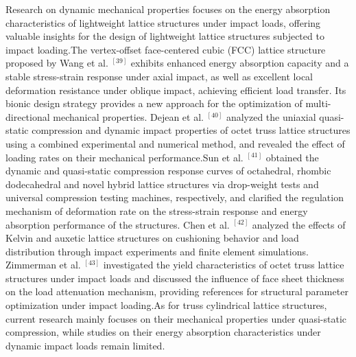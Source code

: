 \documentclass{article} %
\begin{document}
Research on dynamic mechanical properties focuses on the energy absorption characteristics of lightweight lattice structures under impact loads, offering valuable insights for the design of lightweight lattice structures subjected to impact loading.The vertex-offset face-centered cubic (FCC) lattice structure proposed by Wang et al. ${}^{[39]}$ exhibits enhanced energy absorption capacity and a stable stress-strain response under axial impact, as well as excellent local deformation resistance under oblique impact, achieving efficient load transfer. Its bionic design strategy provides a new approach for the optimization of multi-directional mechanical properties. Dejean et al. ${}^{[40]}$ analyzed the uniaxial quasi-static compression and dynamic impact properties of octet truss lattice structures using a combined experimental and numerical method, and revealed the effect of loading rates on their mechanical performance.Sun et al. ${}^{[41]}$ obtained the dynamic and quasi-static compression response curves of octahedral, rhombic dodecahedral and novel hybrid lattice structures via drop-weight tests and universal compression testing machines, respectively, and clarified the regulation mechanism of deformation rate on the stress-strain response and energy absorption performance of the structures. Chen et al. ${}^{[42]}$ analyzed the effects of Kelvin and auxetic lattice structures on cushioning behavior and load distribution through impact experiments and finite element simulations. Zimmerman et al. ${}^{[43]}$ investigated the yield characteristics of octet truss lattice structures under impact loads and discussed the influence of face sheet thickness on the load attenuation mechanism, providing references for structural parameter optimization under impact loading.As for truss cylindrical lattice structures, current research mainly focuses on their mechanical properties under quasi-static compression, while studies on their energy absorption characteristics under dynamic impact loads remain limited.
\end{document}
